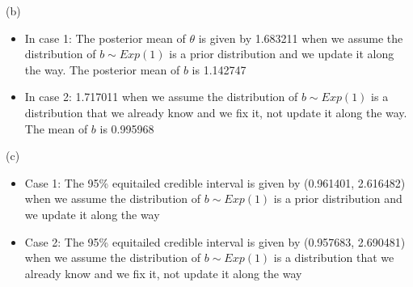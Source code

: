 \documentclass{homeworg}
\begin{document}
(b) 
\begin{itemize}
\item In case 1: The posterior mean of $\theta$ is given by 1.683211 when we assume the distribution of $b\sim Exp(1)$ is a prior distribution and we update it along the way. The posterior mean of $b$ is 1.142747
\item In case 2: 1.717011 when we assume the distribution of $b\sim Exp(1)$ is a distribution that we already know and we fix it, not update it along the way. The mean of $b$ is 0.995968
\end{itemize}


(c) 
\begin{itemize}
\item Case 1: The 95\% equitailed credible interval is given by (0.961401, 2.616482) when we assume the distribution of $b\sim Exp(1)$ is a prior distribution and we update it along the way
\item Case 2: The 95\% equitailed credible interval is given by (0.957683, 2.690481) when we assume the distribution of $b\sim Exp(1)$ is a distribution that we already know and we fix it, not update it along the way
\end{itemize} 



%
%

\pagebreak

%
%
\end{document}
